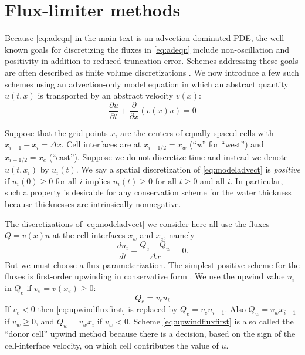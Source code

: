 \documentclass[11pt,final]{amsart}
\newcommand{\ddt}[1]{\ensuremath{\frac{\partial #1}{\partial t}}}
\newcommand{\ddx}[1]{\ensuremath{\frac{\partial #1}{\partial x}}}
\begin{document}
\section{Flux-limiter methods} \label{app:fluxlimiters}

Because \eqref{eq:adeqn} in the main text is an advection-dominated PDE, the well-known goals for discretizing the fluxes in \eqref{eq:adeqn} include non-oscillation and positivity \citep{HundsdorferVerwer2010} in addition to reduced truncation error.  Schemes addressing these goals are often described as finite volume discretizations \citep{LeVeque}.  We now introduce a few such schemes using an advection-only model equation in which an abstract quantity $u(t,x)$ is transported by an abstract velocity $v(x)$:
\begin{equation} \label{eq:modeladvect}
\ddt{u} + \ddx{}\left(v(x) u\right) = 0
\end{equation}

Suppose that the grid points $x_i$ are the centers of equally-spaced cells with $x_{i+1}-x_i=\Delta x$.  Cell interfaces are at $x_{i-1/2}=x_w$ (``\emph{w}'' for ``west'') and $x_{i+1/2}=x_e$ (``east'').  Suppose we do not discretize time and instead we denote $u(t,x_i)$ by $u_i(t)$.  We say a spatial discretization of \eqref{eq:modeladvect} is \emph{positive} if $u_i(0) \ge 0$ for all $i$ implies $u_i(t)\ge 0$ for all $t\ge 0$ and all $i$.  In particular, such a property is desirable for any conservation scheme for the water thickness because thicknesses are intrinsically nonnegative.

The discretizations of \eqref{eq:modeladvect} we consider here all use the fluxes $Q=v(x) u$ at the cell interfaces $x_w$ and $x_e$, namely
\begin{equation}
\frac{du_i}{dt} + \frac{Q_e - Q_w}{\Delta x} = 0. \label{eq:basicmodelFD}
\end{equation}
But we must choose a flux parameterization.  The simplest positive scheme for the fluxes is first-order upwinding in conservative form \citep[section I.4.3]{HundsdorferVerwer2010}.  We use the upwind value $u_i$ in $Q_e$ if $v_e = v(x_e) \ge 0$:
\begin{equation}
Q_e = v_e u_i \label{eq:upwindfluxfirst}
\end{equation}
If $v_e < 0$ then \eqref{eq:upwindfluxfirst} is replaced by $Q_e = v_e u_{i+1}$. 
Also $Q_w = v_w x_{i-1}$ if $v_w \ge 0$, and $Q_w = v_w x_{i}$ if $v_w < 0$.  Scheme \eqref{eq:upwindfluxfirst} is also called the ``donor cell'' upwind method \citep{LeVeque} because there is a decision, based on the sign of the cell-interface velocity, on which cell contributes the value of $u$.
\end{document}

